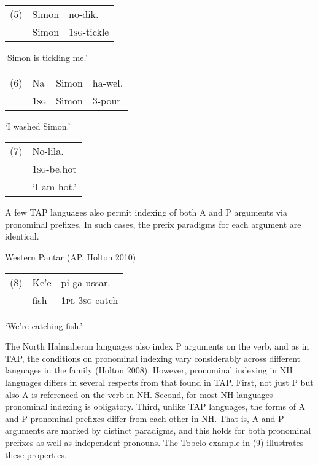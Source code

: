 \begin{flushleft}
\tablehead{}
\begin{supertabular}{m{0.38935986in}m{0.47055987in}m{0.69905984in}}
(5) &
Simon &
no-dik.\\
 &
Simon &
\textsc{1sg}{}-tickle\\
\end{supertabular}
\end{flushleft}
{\textquoteleft}Simon is tickling me.{\textquoteright} 

\begin{flushleft}
\tablehead{}
\begin{supertabular}{m{0.38935986in}m{0.30805984in}m{0.47055987in}m{0.5254598in}}
(6) &
Na &
Simon &
ha-wel.\\
 &
\textsc{1sg} &
Simon &
3-pour\\
\end{supertabular}
\end{flushleft}
{\textquoteleft}I washed Simon.{\textquoteright} 

\begin{flushleft}
\tablehead{}
\begin{supertabular}{m{0.49625984in}m{0.7358598in}}
(7) &
No-lila.\\
 &
\textsc{1sg}{}-be.hot\\
 &
{\textquoteleft}I am hot.{\textquoteright} \\
\end{supertabular}
\end{flushleft}
A few TAP languages also permit indexing of both A and P arguments via pronominal prefixes. In such cases, the prefix paradigms for each argument are identical.

Western Pantar (AP, Holton 2010)

\begin{flushleft}
\tablehead{}
\begin{supertabular}{m{0.41365984in}m{0.48025987in}m{2.5184598in}}
(8) &
Ke{\textquoteright}e &
pi-ga-ussar.\\
 &
fish &
\textsc{1pl-3sg}{}-catch\\
\end{supertabular}
\end{flushleft}
{\textquoteleft}We{\textquoteright}re catching fish.{\textquoteright} 

The North Halmaheran languages also index P arguments on the verb, and as in TAP, the conditions on pronominal indexing vary considerably across different languages in the family (Holton 2008). However, pronominal indexing in NH languages differs in several respects from that found in TAP. First, not just P but also A is referenced on the verb in NH. Second, for most NH languages pronominal indexing is obligatory. Third, unlike TAP languages, the forms of A and P pronominal prefixes differ from each other in NH. That is, A and P arguments are marked by distinct paradigms, and this holds for both pronominal prefixes as well as independent pronouns. The Tobelo example in (9) illustrates these properties.

